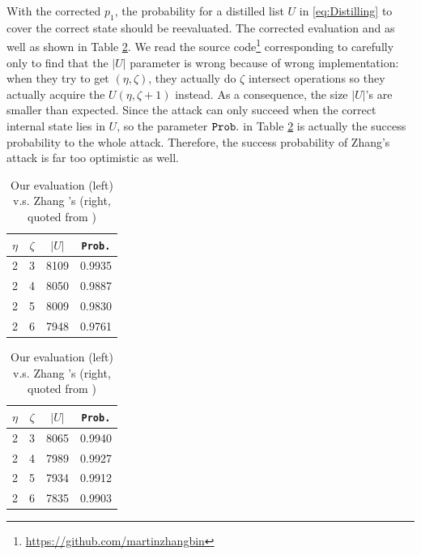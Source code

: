 With the corrected $p_1$, the probability for a distilled list $U$ in \eqref{eq:Distilling} to cover the correct state  should be reevaluated.
The corrected evaluation and as well as shown in Table \ref{tab:ProbInU}.
We read the source code\footnote{\url{https://github.com/martinzhangbin}} corresponding to \cite{AC:Zhang19} carefully only to find that the $|U|$ parameter is wrong because of wrong implementation:
when they try to get $(\eta , \zeta)$, they actually do $\zeta$ intersect operations so they actually acquire the $U(\eta,\zeta+1)$ instead.
As a consequence, the size $|U|$'s are smaller than expected.
Since the attack can only succeed when the correct internal state lies in $U$, so the parameter ${\tt Prob.}$ in Table \ref{tab:ProbInU} is actually the success probability to the whole attack.
Therefore, the success probability of Zhang's attack is far too optimistic as well.
\begin{table}[htbp]
  \centering
  \caption{Our evaluation (left) v.s. Zhang \etal's (right, quoted from \cite{AC:Zhang19})}
  \begin{minipage}[t]{0.45\textwidth}
  \centering
     \begin{tabular}{c|c|c|c}
    \hline
    $\eta$ & $\zeta$ & $|U|$ & {\tt Prob.} \\
    \hline
    \hline
    2     & 3     & 8109  & 0.9935 \\
    2     & 4     & 8050  & 0.9887 \\
    2     & 5     & 8009  & 0.9830 \\
    2     & 6     & 7948  & 0.9761 \\
    \hline
    \end{tabular}%
  \end{minipage}
  \begin{minipage}[t]{0.45\textwidth}
    \centering
        \begin{tabular}{c|c|c|c}
    \hline
   $\eta$ & $\zeta$  & $|U|$ & {\tt Prob.} \\
    \hline
    \hline
    2     & 3     & 8065  & 0.9940 \\
    2     & 4     & 7989  & 0.9927 \\
    2     & 5     & 7934  & 0.9912 \\
    2     & 6     & 7835  & 0.9903 \\
    \hline
    \end{tabular}%
  \end{minipage}
  \label{tab:ProbInU}%
\end{table}%

